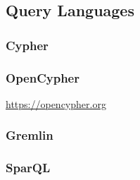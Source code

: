\subsection{Query Languages}
\subsubsection{Cypher}
\subsubsection{OpenCypher}

\url{https://opencypher.org}

\subsubsection{Gremlin}
\subsubsection{SparQL}


